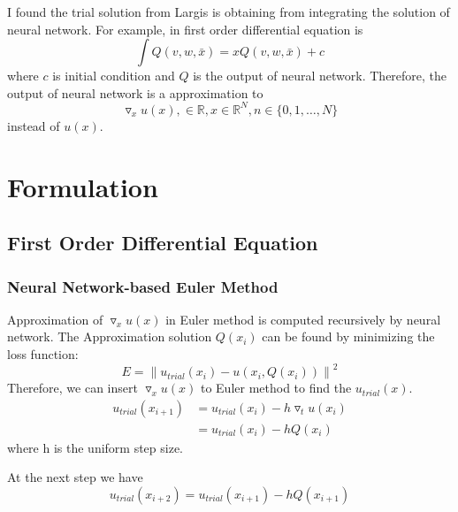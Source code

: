 \documentclass{article}
\begin{document}
	\medskip \noindent
I found the trial solution from Largis is obtaining from integrating the solution of neural network. For example, in first order differential equation is
	\[\int Q(v,w,\bar{x}) = xQ(v,w,\bar{x}) + c \]
	where $c$ is initial condition and $Q$ is the output of neural network.
	Therefore, the output of neural network is a approximation to 
	\[\triangledown_x u(x), \in \mathbb{R}, x \in \mathbb{R}^N, n\in\{0,1, \dots , N\}\]
	instead of $u(x)$. 
	
	\section{Formulation}
	\subsection{First Order Differential Equation}
	\subsubsection{Neural Network-based Euler Method}
	Approximation of $\triangledown_x u(x)$ in Euler method is computed recursively by neural network. 
	The Approximation solution $Q(x_i)$ can be found by minimizing the loss function:
	\begin{equation}\label{eq:ode_total_error}
	E = \left \|  u_{trial}(x_i)-u(x_i, Q(x_i))\right \|^2
	\end{equation}
	Therefore, we can insert $\triangledown_x u(x)$ to Euler method to find the $u_{trial}(x)$. 
	\begin{equation}
	\begin{aligned}
	 	u_{trial}(x_{i+1}) &= u_{trial}(x_{i}) -h\triangledown_t u(x_i) \\
	 	            &= u_{trial}(x_{i})-hQ(x_i)
	 \end{aligned}
	\end{equation}
    where h is the uniform step size. 
    
    \medspace \noindent
    At the next step we have
    \[u_{trial}(x_{i+2})= u_{trial}(x_{i+1})-hQ(x_{i+1})\]
    \medspace \noindent
    
    \section{}
	 
\end{document}
